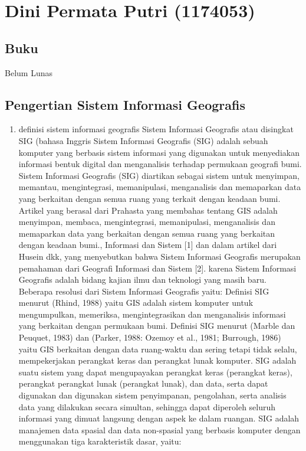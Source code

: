 \section{Dini Permata Putri (1174053)}
\subsection{Buku}
Belum Lunas 
\subsection{Pengertian Sistem Informasi Geografis}
\begin{enumerate}
\item definisi sistem informasi geografis 
Sistem Informasi Geografis atau disingkat SIG (bahasa Inggris Sistem Informasi Geografis (SIG) adalah sebuah komputer yang berbasis sistem informasi yang digunakan untuk menyediakan informasi bentuk digital dan menganalisis terhadap permukaan geografi bumi. Sistem Informasi Geografis (SIG) diartikan sebagai sistem untuk menyimpan, memantau, mengintegrasi, memanipulasi, menganalisis dan memaparkan data yang berkaitan dengan semua ruang yang terkait dengan keadaan bumi. Artikel yang berasal dari Prahasta yang membahas tentang GIS adalah menyimpan, membaca, mengintegrasi, memanipulasi, menganalisis dan memaparkan data yang berkaitan dengan semua ruang yang berkaitan dengan keadaan bumi., Informasi dan Sistem 
[1] dan dalam artikel dari Husein dkk, yang menyebutkan bahwa Sistem Informasi Geografis merupakan pemahaman dari Geografi Informasi dan Sistem [2].
karena Sistem Informasi Geografis adalah bidang kajian ilmu dan teknologi yang masih baru. Beberapa resolusi dari Sistem Informasi Geografis yaitu:
Definisi SIG menurut (Rhind, 1988) yaitu GIS adalah sistem komputer untuk mengumpulkan, memeriksa, mengintegrasikan dan menganalisis informasi yang berkaitan dengan permukaan bumi. 
Definisi SIG menurut (Marble dan Peuquet, 1983) dan (Parker, 1988: Ozemoy et al., 1981; Burrough, 1986) yaitu GIS berkaitan dengan data ruang-waktu dan sering tetapi tidak selalu, mempekerjakan perangkat keras dan perangkat lunak komputer.
SIG adalah suatu sistem yang dapat mengupayakan perangkat keras (perangkat keras), perangkat perangkat lunak (perangkat lunak), dan data, serta dapat digunakan dan digunakan sistem penyimpanan, pengolahan, serta analisis data yang dilakukan secara simultan, sehingga dapat diperoleh seluruh informasi yang dimuat langsung dengan aspek ke dalam ruangan.  SIG adalah manajemen data spasial dan data non-spasial yang berbasis komputer dengan menggunakan tiga karakteristik dasar, yaitu: 

\end{enumerate}
